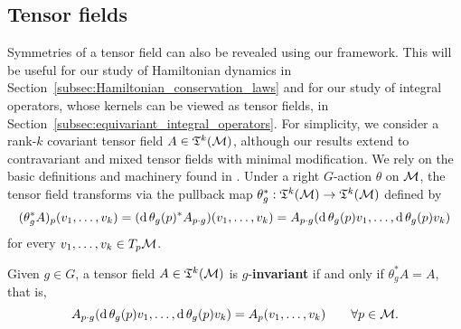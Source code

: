 \documentclass[twoside,11pt]{article}
\begin{document}
\subsection{Tensor fields}
\label{subsec:symmetry_of_tf}
    Symmetries of a tensor field can also be revealed using our framework.
    This will be useful for our study of Hamiltonian dynamics in Section~\ref{subsec:Hamiltonian_conservation_laws} and for our study of integral operators, whose kernels can be viewed as tensor fields, in Section~\ref{subsec:equivariant_integral_operators}.
    For simplicity, we consider a rank-$k$ covariant tensor field $A \in \mathfrak{T}^k({\mathcal{M}})$, although our results extend to contravariant and mixed tensor fields with minimal modification.
    We rely on the basic definitions and machinery found in \citet[Chapter~12]{Lee2013introduction}.
    Under a right $G$-action $\theta$ on ${\mathcal{M}}$, the tensor field transforms via the pullback map $\theta_g^*:\mathfrak{T}^k({\mathcal{M}}) \to \mathfrak{T}^k({\mathcal{M}})$ defined by
    \begin{equation}
        (\theta_g^* A)_p(v_1, \ldots, v_k) 
        = (\operatorname{\mathrm{d}}\theta_g(p)^* A_{p\cdot g})(v_1, \ldots, v_k) 
        = A_{p\cdot g}(\operatorname{\mathrm{d}}\theta_g(p) v_1, \ldots, \operatorname{\mathrm{d}}\theta_g(p) v_k)
    \end{equation}
    for every $v_1, \ldots, v_k \in T_p{\mathcal{M}}$.
    \begin{definition}
        \label{def:invariance_of_tf}
        Given $g\in G$, a tensor field $A\in\mathfrak{T}^k({\mathcal{M}})$ is $g$-\textbf{invariant} if and only if $\theta_g^* A = A$, that is,
        \begin{equation}
            A_{p\cdot g}(\operatorname{\mathrm{d}}\theta_g(p) v_1, \ldots, \operatorname{\mathrm{d}}\theta_g(p) v_k) = A_p(v_1, \ldots, v_k) \qquad \forall p\in{\mathcal{M}}.
        \end{equation}
    \end{definition}
    
\end{document}
